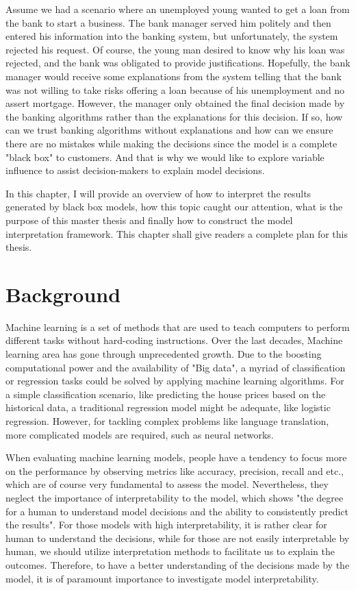 
Assume we had a scenario where an unemployed young wanted to get a loan from the bank to start a business. The bank manager served him politely and then entered his information into the banking system, but unfortunately, the system rejected his request. Of course, the young man desired to know why his loan was rejected, and the bank was obligated to provide justifications. Hopefully, the bank manager would receive some explanations from the system telling that the bank was not willing to take risks offering a loan because of his unemployment and no assert mortgage. However, the manager only obtained the final decision made by the banking algorithms rather than the explanations for this decision. If so, how can we trust banking algorithms without explanations and how can we ensure there are no mistakes while making the decisions since the model is a complete "black box" to customers. And that is why we would like to explore variable influence to assist decision-makers to explain model decisions. 

In this chapter, I will provide an overview of how to interpret the results generated by black box models, how this topic caught our attention, what is the purpose of this master thesis and finally how to construct the model interpretation framework. This chapter shall give readers a complete plan for this thesis. 

\section{Background}

Machine learning is a set of methods that are used to teach computers to perform different tasks without hard-coding instructions. Over the last decades, Machine learning area has gone through unprecedented growth. Due to the boosting computational power and the availability of "Big data", a myriad of classification or regression tasks could be solved by applying machine learning algorithms. For a simple classification scenario, like predicting the house prices based on the historical data, a traditional regression model might be adequate, like logistic regression. However, for tackling complex problems like language translation, more complicated models are required, such as neural networks. 

When evaluating machine learning models, people have a tendency to focus more on the performance by observing metrics like accuracy, precision, recall and etc., which are of course very fundamental to assess the model. Nevertheless, they neglect the importance of interpretability to the model, which shows "the degree for a human to understand model decisions and the ability to consistently predict the results"\cite{kim2016examples}. For those models with high interpretability, it is rather clear for human to understand the decisions, while for those are not easily interpretable by human, we should utilize interpretation methods to facilitate us to explain the outcomes. Therefore, to have a better understanding of the decisions made by the model, it is of paramount importance to investigate model interpretability.

